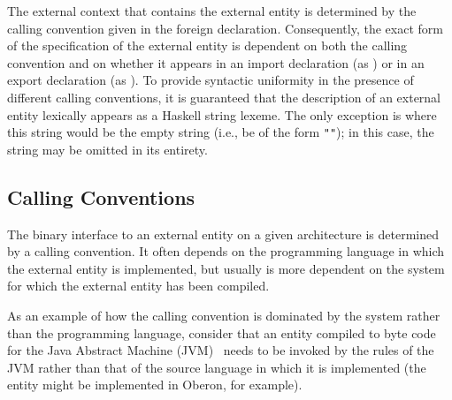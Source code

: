 \documentclass[a4paper,twoside]{article}
\newcommand{\code}[1]{\texttt{#1}}      %
\begin{document}
The external context that contains the external entity is determined by the
calling convention given in the foreign declaration.  Consequently, the exact
form of the specification of the external entity is dependent on both the
calling convention and on whether it appears in an import declaration (as
) or in an export declaration (as ).  To provide
syntactic uniformity in the presence of different calling conventions, it is
guaranteed that the description of an external entity lexically appears as a
Haskell string lexeme.  The only exception is where this string would be the
empty string (i.e., be of the form \code{""}); in this case, the string may be
omitted in its entirety.

\subsection{Calling Conventions}
\label{sec:call-conv}

The binary interface to an external entity on a given architecture is
determined by a calling convention.  It often depends on the programming
language in which the external entity is implemented, but usually is more
dependent on the system for which the external entity has been compiled.

As an example of how the calling convention is dominated by the system rather
than the programming language, consider that an entity compiled to byte code
for the Java Abstract Machine (JVM)~\cite{lindholm-etal:JVM} needs to be
invoked by the rules of the JVM rather than that of the source language in
which it is implemented (the entity might be implemented in Oberon, for
example).
\end{document}
